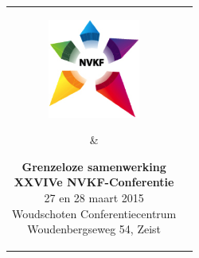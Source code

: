 \documentclass[a4paper,10pt]{report}
\begin{document}
\pagestyle{empty}
\thispagestyle{empty}


\noindent
\begin{tabular}{cc}
    \parbox[b]{0.4\linewidth}{%
\includegraphics[width=3cm]{nvkf_logo}
}
& 
\parbox[b]{0.6\linewidth}{%
\begin{center}
{\bfseries Grenzeloze samenwerking}\\ \vspace{0.15cm} 
{\bfseries XXVIVe NVKF-Conferentie}\\ \vspace{0.15cm}
{27 en 28 maart 2015}\\ \vspace{0.15cm}
{Woudschoten Conferentiecentrum}\\
{Woudenbergseweg 54, Zeist}

\end{center}
}
\end{tabular}


\newcommand{\plenairheader}[2]{%
\begin{center}
{\color{DarkBlue}{\textbf{#1}}}\\
{\textbf{#2}}
\end{center}
}

\newcommand{\parallelheader}[2]{%
\parskip=0pt
\noindent{{\color{Blue}{\textbf{\textit{{#1}}}}}\hfill{\textit{{#2}}}}\vspace{-0.2cm}
}

\newcommand{\parallelitem}[1]{%
\noindent \hfill{\color{DarkBlue}{\textbf{\textsc{{#1}}}}}\hfill\strut
}

\newenvironment{packed_enum}{%
    \begin{enumerate}
    \setlength{\itemsep}{1pt}
    \setlength{\itemindent}{0pt}
    \setlength{\parskip}{0pt}
    \setlength{\parsep}{0pt}
    \setlength{\leftmargin}{0pt}
}{\end{enumerate}}
\end{document}
